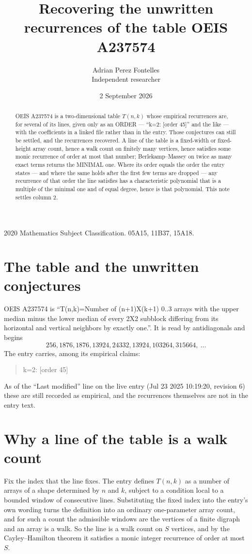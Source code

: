 \documentclass[11pt,a4paper]{article}
\title{Recovering the unwritten recurrences of the table OEIS A237574}
\author{Adrian Perez Fontelles\\ \small Independent researcher}
\date{2 September 2026}
\theoremstyle{plain}
\theoremstyle{definition}
\begin{document}
\maketitle

\begin{abstract}
OEIS A237574 is a two-dimensional table $T(n,k)$ whose empirical recurrences are, for several of
its lines, given only as an ORDER --- ``k=2: [order 45]'' and the like --- with the
coefficients in a linked file rather than in the entry. Those conjectures can still be settled,
and the recurrences recovered. A line of the table is a fixed-width or fixed-height array
count, hence a walk count on finitely many vertices, hence satisfies some monic recurrence of
order at most that number; Berlekamp--Massey on twice as many exact terms returns the MINIMAL
one. Where its order equals the order the entry states --- and where the same holds after the
first few terms are dropped --- any recurrence of that order the line satisfies has a
characteristic polynomial that is a multiple of the minimal one and of equal degree, hence is
that polynomial. This note settles column 2.
\end{abstract}

\noindent\small 2020 Mathematics Subject Classification. 05A15, 11B37, 15A18.\normalsize

\section{The table and the unwritten conjectures}

OEIS A237574 is ``T(n,k)=Number of (n+1)X(k+1) 0..3 arrays with the upper median minus the lower median of every 2X2 subblock differing from its horizontal and vertical neighbors by exactly one.''. It is read by antidiagonals and begins
\[
256, 1876, 1876, 13924, 24332, 13924, 103264, 315664,\ \dots
\]
The entry carries, among its empirical claims:
\begin{quote}\small
k=2: [order 45]
\end{quote}
As of the ``Last modified'' line on the live entry (Jul 23 2025 10:19:20, revision 6) these are still
recorded as empirical, and the recurrences themselves are not in the entry text.

\section{Why a line of the table is a walk count}

Fix the index that the line fixes. The entry defines $T(n,k)$ as a number of arrays of a shape
determined by $n$ and $k$, subject to a condition local to a bounded window of consecutive
lines. Substituting the fixed index into the entry's own wording turns the definition into an
ordinary one-parameter array count, and for such a count the admissible windows are the
vertices of a finite digraph and an array is a walk. So the line is a walk count on $S$
vertices, and by the Cayley--Hamilton theorem it satisfies a monic integer recurrence of order
at most $S$.
\end{document}
